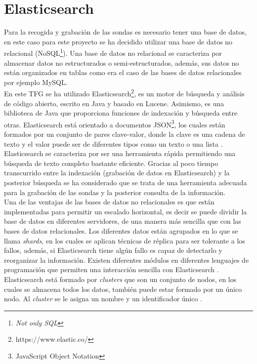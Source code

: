 \section{Elasticsearch}
Para la recogida y grabación de las sondas es necesario tener una base de datos, en este caso para este proyecto se ha decidido utilizar una base de datos no relacional (NoSQL\footnote{\textit{Not only SQL}}). Una base de datos no relacional se caracteriza por almacenar datos no estructurados o semi-estructurados, además, sus datos no están organizados en tablas como era el caso de las bases de datos relacionales por ejemplo MySQL.\\

En este TFG se ha utilizado Elasticsearch\footnote{https://www.elastic.co/}, es un motor de búsqueda y análisis de código abierto, escrito en Java y basado en Lucene. Asimismo, es una biblioteca de Java que proporciona funciones de indexación y búsqueda entre otras. Elasticsearch está orientado a documentos JSON\footnote{JavaScript Object Notation}, los cuales están formados por un conjunto de pares clave-valor, donde la clave es una cadena de texto y el valor puede ser de diferentes tipos como un texto o una lista \cite{elastic}.\\

Elasticsearch se caracteriza por ser una herramienta rápida permitiendo una búsqueda de texto completo bastante eficiente. Gracias al poco tiempo transcurrido entre la indexación (grabación de datos en Elasticsearch) y la posterior búsqueda se ha considerado que se trata de una herramienta adecuada para la grabación de las sondas y la posterior consulta de la información.\\

Una de las ventajas de las bases de datos no relacionales es que están implementadas para permitir un escalado horizontal, es decir se puede dividir la base de datos en diferentes servidores, de una manera más sencilla que con las bases de datos relacionales. Los diferentes datos están agrupados en lo que se llama \textit{shards}, en los cuales se aplican técnicas de réplica para ser tolerante a los fallos, además, si Elasticsearch tiene algún fallo es capaz de detectarlo y reorganizar la información. Existen diferentes módulos en diferentes lenguajes de programación que permiten una interacción sencilla con Elasticsearch \cite{elastic2}.\\

Elasticsearch está formado por \textit{clusters} que son un conjunto de nodos, en los cuales se almacena todos los datos, también puede estar formado por un único nodo. Al \textit{cluster} se le asigna un nombre y un identificador único \cite{elastic3}.\\

